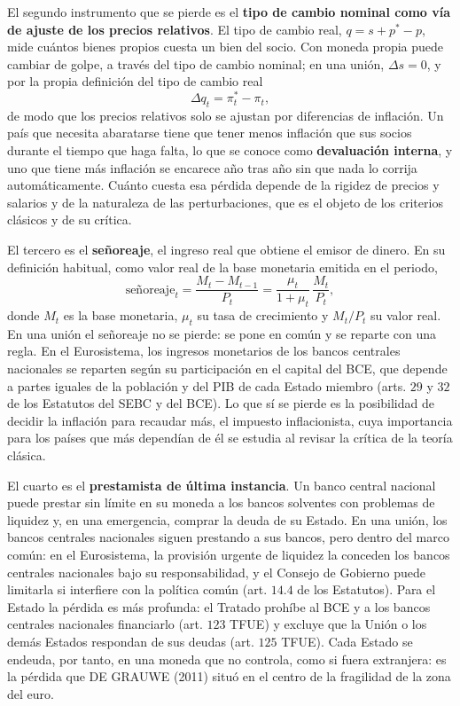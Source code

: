 \documentclass[10pt,a4paper]{article}
\begin{document}
El segundo instrumento que se pierde es el \textbf{tipo de cambio nominal como vía de ajuste de los precios relativos}. El tipo de cambio real, $q=s+p^*-p$, mide cuántos bienes propios cuesta un bien del socio. Con moneda propia puede cambiar de golpe, a través del tipo de cambio nominal; en una unión, $\Delta s=0$, y por la propia definición del tipo de cambio real
$$\Delta q_t=\pi^*_t-\pi_t,$$
de modo que los precios relativos solo se ajustan por diferencias de inflación. Un país que necesita abaratarse tiene que tener menos inflación que sus socios durante el tiempo que haga falta, lo que se conoce como \textbf{devaluación interna}, y uno que tiene más inflación se encarece año tras año sin que nada lo corrija automáticamente. Cuánto cuesta esa pérdida depende de la rigidez de precios y salarios y de la naturaleza de las perturbaciones, que es el objeto de los criterios clásicos y de su crítica.

El tercero es el \textbf{señoreaje}, el ingreso real que obtiene el emisor de dinero. En su definición habitual, como valor real de la base monetaria emitida en el periodo,
$$\text{señoreaje}_t=\frac{M_t-M_{t-1}}{P_t}=\frac{\mu_t}{1+\mu_t}\,\frac{M_t}{P_t},$$
donde $M_t$ es la base monetaria, $\mu_t$ su tasa de crecimiento y $M_t/P_t$ su valor real. En una unión el señoreaje no se pierde: se pone en común y se reparte con una regla. En el Eurosistema, los ingresos monetarios de los bancos centrales nacionales se reparten según su participación en el capital del BCE, que depende a partes iguales de la población y del PIB de cada Estado miembro (arts. $29$ y $32$ de los Estatutos del SEBC y del BCE). Lo que sí se pierde es la posibilidad de decidir la inflación para recaudar más, el impuesto inflacionista, cuya importancia para los países que más dependían de él se estudia al revisar la crítica de la teoría clásica.

El cuarto es el \textbf{prestamista de última instancia}. Un banco central nacional puede prestar sin límite en su moneda a los bancos solventes con problemas de liquidez y, en una emergencia, comprar la deuda de su Estado. En una unión, los bancos centrales nacionales siguen prestando a sus bancos, pero dentro del marco común: en el Eurosistema, la provisión urgente de liquidez la conceden los bancos centrales nacionales bajo su responsabilidad, y el Consejo de Gobierno puede limitarla si interfiere con la política común (art. $14.4$ de los Estatutos). Para el Estado la pérdida es más profunda: el Tratado prohíbe al BCE y a los bancos centrales nacionales financiarlo (art. $123$ TFUE) y excluye que la Unión o los demás Estados respondan de sus deudas (art. $125$ TFUE). Cada Estado se endeuda, por tanto, en una moneda que no controla, como si fuera extranjera: es la pérdida que DE GRAUWE (2011) situó en el centro de la fragilidad de la zona del euro.
\end{document}
